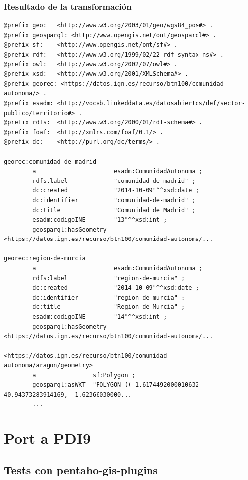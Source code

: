 \subsubsection{Resultado de la transformación}
\footnotesize
\begin{verbatim}
@prefix geo:   <http://www.w3.org/2003/01/geo/wgs84_pos#> .
@prefix geosparql: <http://www.opengis.net/ont/geosparql#> .
@prefix sf:    <http://www.opengis.net/ont/sf#> .
@prefix rdf:   <http://www.w3.org/1999/02/22-rdf-syntax-ns#> .
@prefix owl:   <http://www.w3.org/2002/07/owl#> .
@prefix xsd:   <http://www.w3.org/2001/XMLSchema#> .
@prefix georec: <https://datos.ign.es/recurso/btn100/comunidad-autonoma/> .
@prefix esadm: <http://vocab.linkeddata.es/datosabiertos/def/sector-publico/territorio#> .
@prefix rdfs:  <http://www.w3.org/2000/01/rdf-schema#> .
@prefix foaf:  <http://xmlns.com/foaf/0.1/> .
@prefix dc:    <http://purl.org/dc/terms/> .

georec:comunidad-de-madrid
        a                      esadm:ComunidadAutonoma ;
        rdfs:label             "comunidad-de-madrid" ;
        dc:created             "2014-10-09"^^xsd:date ;
        dc:identifier          "comunidad-de-madrid" ;
        dc:title               "Comunidad de Madrid" ;
        esadm:codigoINE        "13"^^xsd:int ;
        geosparql:hasGeometry  <https://datos.ign.es/recurso/btn100/comunidad-autonoma/...

georec:region-de-murcia
        a                      esadm:ComunidadAutonoma ;
        rdfs:label             "region-de-murcia" ;
        dc:created             "2014-10-09"^^xsd:date ;
        dc:identifier          "region-de-murcia" ;
        dc:title               "Region de Murcia" ;
        esadm:codigoINE        "14"^^xsd:int ;
        geosparql:hasGeometry  <https://datos.ign.es/recurso/btn100/comunidad-autonoma/...

<https://datos.ign.es/recurso/btn100/comunidad-autonoma/aragon/geometry>
        a                sf:Polygon ;
        geosparql:asWKT  "POLYGON ((-1.6174492000010632 40.94373283914169, -1.62366030000...
        ...
\end{verbatim}
\normalsize


\section{Port a PDI9}

\subsection{Tests con pentaho-gis-plugins}

